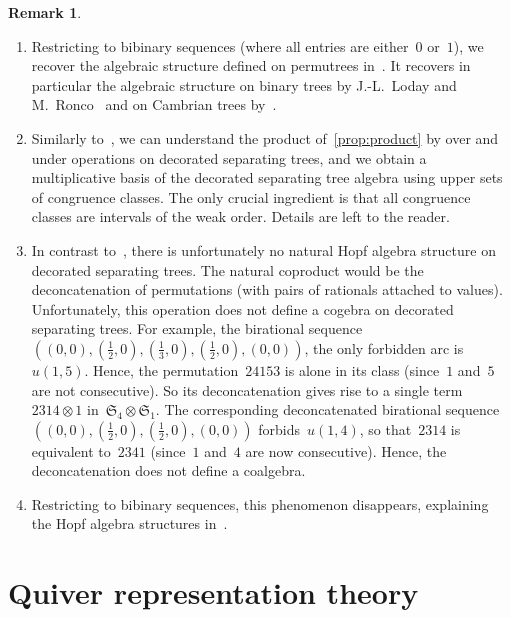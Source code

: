 \documentclass{amsart}
\theoremstyle{definition}
\newtheorem{remark}[theorem]{Remark}
\newcommand{\f}[1]{{\mathfrak{#1}}} %
\begin{document}
\begin{remark}
\begin{enumerate}
\item Restricting to bibinary sequences (where all entries are either~$0$ or~$1$), we recover the algebraic structure defined on permutrees in~\cite{PilaudPons-permutrees}. It recovers in particular the algebraic structure on binary trees by J.-L.~Loday and M.~Ronco~\cite{LodayRonco} and on Cambrian trees by~\cite{ChatelPilaud}.
\item Similarly to~\cite{ChatelPilaud, PilaudPons-permutrees}, we can understand the product of~\cref{prop:product} by over and under operations on decorated separating trees, and we obtain a multiplicative basis of the decorated separating tree algebra using upper sets of congruence classes. The only crucial ingredient is that all congruence classes are intervals of the weak order. Details are left to the reader.
\item In contrast to~\cite{LodayRonco, ChatelPilaud, PilaudPons-permutrees}, there is unfortunately no natural Hopf algebra structure on decorated separating trees. The natural coproduct would be the deconcatenation of permutations (with pairs of rationals attached to values). Unfortunately, this operation does not define a cogebra on decorated separating trees. For example, the birational sequence~$((0,0), (\frac12,0), (\frac13,0), (\frac12,0), (0,0))$, the only forbidden arc is~$u(1,5)$. Hence, the permutation~$24153$ is alone in its class (since~$1$ and~$5$ are not consecutive). So its deconcatenation gives rise to a single term~$2314 \otimes 1$ in~$\f{S}_4 \otimes \f{S}_1$. The corresponding deconcatenated birational sequence~$((0,0), (\frac12,0), (\frac12,0), (0,0))$ forbids~$u(1,4)$, so that~$2314$ is equivalent to~$2341$ (since~$1$ and~$4$ are now consecutive). Hence, the deconcatenation does not define a coalgebra.
\item Restricting to bibinary sequences, this phenomenon disappears, explaining the Hopf algebra structures in~\cite{LodayRonco, ChatelPilaud, PilaudPons-permutrees}.
\end{enumerate}
\end{remark}


\section{Quiver representation theory}
\label{subsec:representationTheory}
\end{document}
